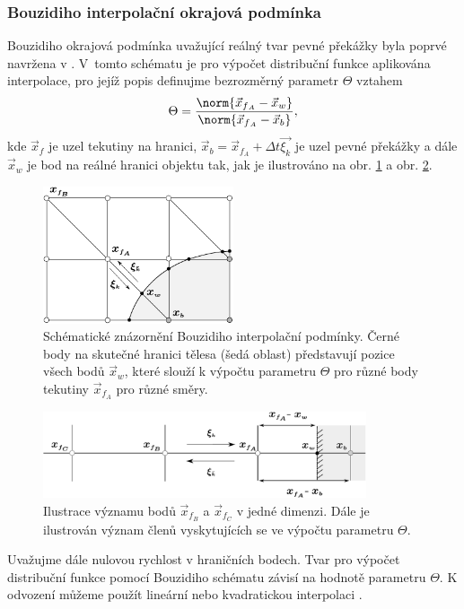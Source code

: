 \subsubsection{\fontsize{12}{15}\selectfont Bouzidiho interpolační okrajová podmínka}
Bouzidiho okrajová podmínka uvažující reálný tvar pevné překážky byla poprvé navržena v \cite{Bouzidi2001}. V~tomto schématu je pro výpočet distribuční funkce aplikována interpolace, pro jejíž popis definujme bezrozměrný parametr $ \Theta $ vztahem
\begin{equation}\label{eq:q}
\Theta = \frac{\norm{\vec{x}_{f{_A}}-\vec{x}_w}}{\norm{\vec{x}_{f{_A}}-\vec{x}_b}},
\end{equation}
kde $ \vec{x}_f $ je uzel tekutiny na hranici, $ \vec{x}_b =  \vec{x}_{f{_A}} + \Delta t \vec{\xi_{k}}$ je uzel pevné překážky a dále $ \vec{x}_w$ je bod na reálné hranici objektu tak, jak je ilustrováno na obr. \ref{fig:bouz} a obr. \ref{fig:bouz2}.
\begin{figure}[h]
	\centering
	\vspace{.1mm}
	\includegraphics[width=0.5\textwidth]{Images/bouzidi.pdf}
	\vspace{1.8mm}
	\caption{Schématické znázornění Bouzidiho interpolační podmínky. Černé body na skutečné hranici tělesa (šedá oblast) představují pozice všech bodů $ \vec{x}_w$, které slouží k výpočtu parametru $ \Theta $ pro různé body tekutiny $ \vec{x}_{f{_A}} $ pro různé směry.}
	\label{fig:bouz}
	\vspace{1.8mm}
\end{figure}

\begin{figure}[h]
	\centering
	\vspace{-5.8mm}
	\includegraphics[width=0.85\textwidth]{Images/bouzidi2.pdf}
	\vspace{1.8mm}
	\caption{Ilustrace významu bodů $ \vec{x}_{f{_B}} $ a $ \vec{x}_{f{_C}} $ v jedné dimenzi. Dále je ilustrován význam členů vyskytujících se ve výpočtu parametru $ \Theta $.}
	\label{fig:bouz2}
	\vspace{1.8mm}
\end{figure}
Uvažujme dále nulovou rychlost v hraničních bodech. Tvar pro výpočet distribuční funkce pomocí Bouzidiho schématu závisí na hodnotě parametru $ \Theta $. K odvození můžeme použít lineární nebo kvadratickou interpolaci \cite{Bouzidi2001}.

